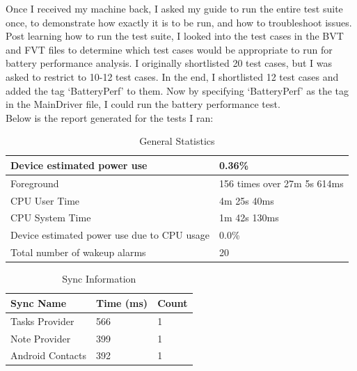 \documentclass[a4paper,12pt]{article}
\begin{document}
Once I received my machine back, I asked my guide to run the entire test suite once, to demonstrate how exactly it is to be run, and how to troubleshoot issues. \\

Post learning how to run the test suite, I looked into the test cases in the BVT and FVT files to determine which test cases would be appropriate to run for battery performance analysis. I originally shortlisted 20 test cases, but I was asked to restrict to 10-12 test cases. In the end, I shortlisted 12 test cases and added the tag `BatteryPerf' to them. Now by specifying `BatteryPerf' as the tag in the MainDriver file, I could run the battery performance test.\\

Below is the report generated for the tests I ran:

\begin{table}[!h]
\begin{center}
\caption{General Statistics}
\label{my-label}
\begin{tabular}{|P{8cm}|P{6.5cm}|}
\hline
Device estimated power use                  & 0.36\%                      \\ \hline
Foreground                                  & 156 times over 27m 5s 614ms \\ \hline
CPU User Time                               & 4m 25s 40ms                 \\ \hline
CPU System Time                             & 1m 42s 130ms                \\ \hline
Device estimated power use due to CPU usage & 0.0\%                       \\ \hline
Total number of wakeup alarms               & 20     \\    \hline                
\end{tabular}
\end{center}
\end{table}

\begin{table}[!h]
\begin{center}
\caption{Sync Information}
\label{my-label}
\begin{tabular}{|P{4cm}|P{4cm}|P{4cm}|}
\hline
Sync Name        & Time (ms) & Count \\ \hline
Tasks Provider   & 566       & 1     \\ \hline
Note Provider    & 399       & 1     \\ \hline
Android Contacts & 392       & 1    \\ \hline
\end{tabular}
\end{center}
\end{table}
\pagebreak
\end{document}
